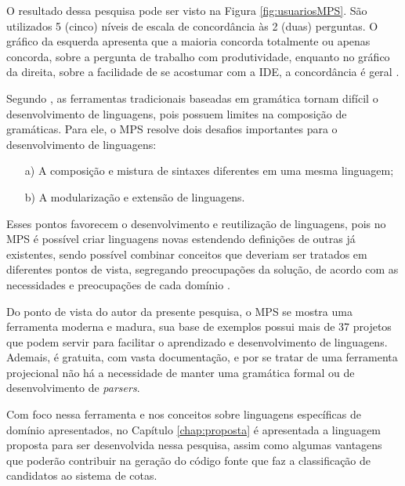 O resultado dessa pesquisa pode ser visto na Figura \ref{fig:usuariosMPS}. São utilizados 5 (cinco) níveis de escala de concordância às 2 (duas) perguntas. O gráfico da esquerda apresenta que a maioria concorda totalmente ou apenas concorda, sobre a pergunta de trabalho com produtividade, enquanto no gráfico da direita, sobre a facilidade de se acostumar com a \gls{IDE}, a concordância é geral \cite{voelter2014generic}.



Segundo , as ferramentas tradicionais baseadas em gramática tornam difícil o desenvolvimento de linguagens, pois possuem limites na composição de gramáticas. Para ele, o \gls{MPS} resolve dois desafios importantes para o desenvolvimento de linguagens: 
\begin{enumerate}
    \item[a)] A composição e mistura de sintaxes diferentes em uma mesma linguagem;
    \item[b)] A modularização e extensão de linguagens.
\end{enumerate}

Esses pontos favorecem o desenvolvimento e reutilização de linguagens, pois no \gls{MPS} é possível criar linguagens novas estendendo definições de outras já existentes, sendo possível combinar conceitos que deveriam ser tratados em diferentes pontos de vista, segregando preocupações da solução, de acordo com as necessidades e preocupações de cada domínio \cite{volter2011language}.

Do ponto de vista do autor da presente pesquisa, o \gls{MPS} se mostra uma ferramenta moderna e madura, sua base de exemplos possui mais de 37 projetos que podem servir para facilitar o aprendizado e desenvolvimento de linguagens. Ademais, é gratuita, com vasta documentação, e por se tratar de uma ferramenta projecional não há a necessidade de manter uma gramática formal ou de desenvolvimento de \textit{parsers}.

Com foco nessa ferramenta e nos conceitos sobre linguagens específicas de domínio apresentados, no Capítulo \ref{chap:proposta} é apresentada a linguagem proposta para ser desenvolvida nessa pesquisa, assim como algumas vantagens que poderão contribuir na geração do código fonte que faz a classificação de candidatos ao sistema de cotas.